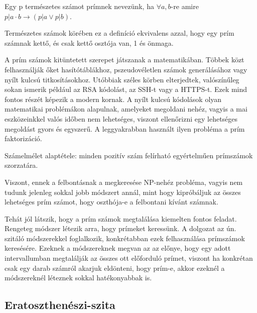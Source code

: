 \documentclass[twoside, a4paper, 12pt]{article}
\begin{document}
\begin{definition} Egy p természetes számot prímnek nevezünk, ha \(\forall a,b\)-re amire \(p|a \cdot b \rightarrow (p|a \vee p|b)\). \end{definition}
Természetes számok körében ez a definíció ekvivalens azzal, hogy egy prím számnak kettő, és csak kettő osztója van, 1 és önmaga. \par
A prím számok kitüntetett szerepet játszanak a matematikában. Többek közt felhasználják őket hasítótáblákhoz, pszeudovéletlen számok generálásához vagy nyílt kulcsú titkosításokhoz. Utóbbiak széles körben elterjedtek, valószínűleg sokan ismerik például az RSA kódolást, az SSH-t vagy a HTTPS-t. Ezek mind fontos részét képezik a modern kornak. A nyílt kulcsú kódolások olyan matematikai problémákon alapulnak, amelyeket megoldani nehéz, vagyis a mai eszközeinkkel valós időben nem lehetséges, viszont ellenőrizni egy lehetséges megoldást gyors és egyszerű. A leggyakrabban használt ilyen probléma a prím faktorizáció. \par
Számelmélet alaptétele: minden pozitív szám felírható egyértelműen prímszámok szorzatára. \par
Viszont, ennek a felbontásnak a megkeresése NP-nehéz probléma, vagyis nem tudunk jelenleg sokkal jobb módszert annál, mint hogy kipróbáljuk az összes lehetséges prím számot, hogy oszthója-e a felbontani kívánt számnak.\par
Tehát jól látszik, hogy a prím számok megtalálása  kiemelten fontos feladat. Rengeteg módszer létezik arra, hogy prímeket keressünk. A dolgozat az ún. szitáló módszerekkel foglalkozik, konkrétabban ezek felhasználása prímszámok keresésére. Ezeknek a módszereknek megvan az az előnye, hogy egy adott intervallumban megtalálják az összes ott előforduló prímet, viszont ha konkrétan csak egy darab számról akarjuk eldönteni, hogy prím-e, akkor ezeknél a módszereknél léteznek sokkal hatékonyabbak is.

\subsection{Eratoszthenészi-szita}
\end{document}
